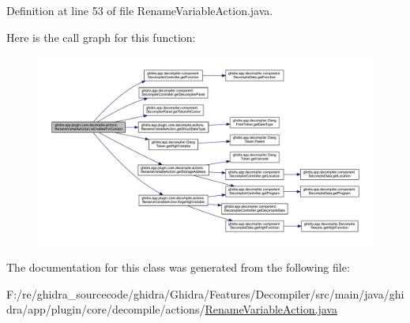 Definition at line 53 of file Rename\+Variable\+Action.\+java.

Here is the call graph for this function\+:
\nopagebreak
\begin{figure}[H]
\begin{center}
\leavevmode
\includegraphics[width=350pt]{classghidra_1_1app_1_1plugin_1_1core_1_1decompile_1_1actions_1_1_rename_variable_action_a823658f79732c41f5c7e6951d95df83b_cgraph}
\end{center}
\end{figure}


The documentation for this class was generated from the following file\+:\begin{DoxyCompactItemize}
\item 
F\+:/re/ghidra\+\_\+sourcecode/ghidra/\+Ghidra/\+Features/\+Decompiler/src/main/java/ghidra/app/plugin/core/decompile/actions/\mbox{\hyperlink{_rename_variable_action_8java}{Rename\+Variable\+Action.\+java}}\end{DoxyCompactItemize}

